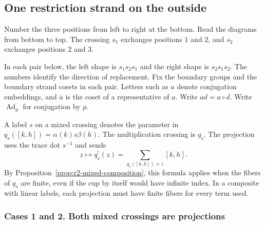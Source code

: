 \documentclass[11pt,a4paper]{article}
\numberwithin{equation}{section}
\theoremstyle{definition}
\begin{document}
\subsection{One restriction strand on the outside}\label{sec:outside-restriction}

Number the three positions from left to right at the bottom.
Read the diagrams from bottom to top. The crossing \(s_1\) exchanges
positions \(1\) and \(2\), and \(s_2\) exchanges positions \(2\) and \(3\).

\begin{center}
\end{center}

In each pair below, the left shape is \(s_1s_2s_1\) and the right shape is
\(s_2s_1s_2\). The numbers identify the direction of replacement.
Fix the boundary groups and the boundary strand cosets in each pair.
Letters such as \(a\) denote conjugation embeddings, and \(\bar a\) is
the coset of a representative of \(a\). Write \(ad=a\circ d\).
Write \(\operatorname{Ad}_p\) for conjugation by \(p\).

A label \(s\) on a mixed crossing denotes the parameter in
\(q_s([k,h])=\alpha(k)s\beta(h)\). The multiplication crossing is
\(q_s\). The projection uses the trace dot \(s^{-1}\) and sends
\[
 z\longmapsto q_s^!(z)=\sum_{q_s([k,h])=z}[k,h].
\]
By Proposition~\ref{prop:r2-mixed-composition}, this formula applies
when the fibers of \(q_s\) are finite, even if the cup by itself
would have infinite index. In a composite with linear labels,
each projection must have finite fibers for every term used.

\subsubsection{Cases 1 and 2. Both mixed crossings are projections}
\end{document}
